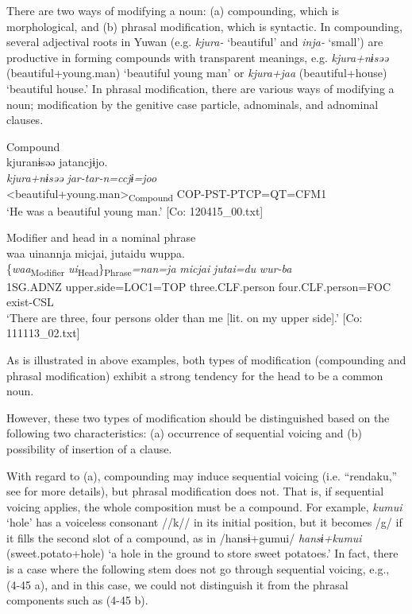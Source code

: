 There are two ways of modifying a noun: (a) compounding, which is morphological, and (b) phrasal modification, which is syntactic. In compounding, several adjectival roots in Yuwan (e.g. \textit{kjura-} ‘beautiful’ and \textit{inja-} ‘small’) are productive in forming compounds with transparent meanings, e.g. \textit{kjura+nɨsəə} (beautiful+young.man) ‘beautiful young man’ or \textit{kjura+jaa} (beautiful+house) ‘beautiful house.’ In phrasal modification, there are various ways of modifying a noun; modification by the genitive case particle, adnominals, and adnominal clauses.

\ea  \label{ex:4.45}
\ea Compound \label{ex:4.45a}\\
\glll   kjuranɨsəə  jatancjɨjo.\\
      \textit{kjura+nɨsəə}  \textit{jar-tar-n=ccjɨ=joo}\\
      <beautiful+young.man>\textsubscript{Compound}  COP-PST-PTCP=QT=CFM1\\
      \glt       ‘He was a beautiful young man.’ [Co: 120415\_00.txt]

\ex Modifier and head in a nominal phrase\\
\glll waa  uinannja  micjai, jutaidu  wuppa.\\
      \{\textit{waa}\textsubscript{Modifier}  \textit{ui}\textsubscript{Head}\}\textsubscript{Phrase}\textit{=nan=ja}  \textit{micjai}  \textit{jutai=du}  \textit{wur-ba}\\                                                                                                                                       
      1SG.ADNZ  upper.side=LOC1=TOP  three.CLF.person           {}                                                           {}             four.CLF.person=FOC  exist-CSL\\
    \glt    ‘There are three, four persons older than me [lit. on my upper side].’   [Co: 111113\_02.txt]
  \z
\z

As is illustrated in above examples, both types of modification (compounding and phrasal modification) exhibit a strong tendency for the head to be a common noun.

However, these two types of modification should be distinguished based on the following two characteristics: (a) occurrence of sequential voicing and (b) possibility of insertion of a clause.

With regard to (a), compounding may induce sequential voicing (i.e. “rendaku,” see  for more details), but phrasal modification does not. That is, if sequential voicing applies, the whole composition must be a compound. For example, \textit{kumui} ‘hole’ has a voiceless consonant //k// in its initial position, but it becomes /g/ if it fills the second slot of a compound, as in /hansɨ+gumui/ \textit{hansɨ+kumui} (sweet.potato+hole) ‘a hole in the ground to store sweet potatoes.’ In fact, there is a case where the following stem does not go through sequential voicing, e.g., (4-45 a), and in this case, we could not distinguish it from the phrasal components such as (4-45 b).

